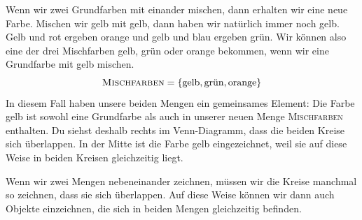 \documentclass[../../main.tex]{subfiles}
\begin{document}
\begin{example}{}

    Wenn wir zwei Grundfarben mit einander mischen, dann erhalten wir eine neue Farbe. Mischen wir gelb mit gelb, dann haben wir natürlich immer noch gelb. Gelb und rot ergeben orange und gelb und blau ergeben grün. Wir können also eine der drei Mischfarben gelb, grün oder orange bekommen, wenn wir eine Grundfarbe mit gelb mischen.
    \[\textsc{Mischfarben}=\{\text{gelb},\text{grün},\text{orange}\}\]
    In diesem Fall haben unsere beiden Mengen ein gemeinsames Element: Die Farbe gelb ist sowohl eine Grundfarbe als auch in unserer neuen Menge \textsc{Mischfarben} enthalten. Du siehst deshalb rechts im Venn-Diagramm, dass die beiden Kreise sich überlappen. In der Mitte ist die Farbe gelb eingezeichnet, weil sie auf diese Weise in beiden Kreisen gleichzeitig liegt.
\end{example}

Wenn wir zwei Mengen nebeneinander zeichnen, müssen wir die Kreise manchmal so zeichnen, dass sie sich überlappen. Auf diese Weise können wir dann auch Objekte einzeichnen, die sich in beiden Mengen gleichzeitig befinden.
\end{document}
